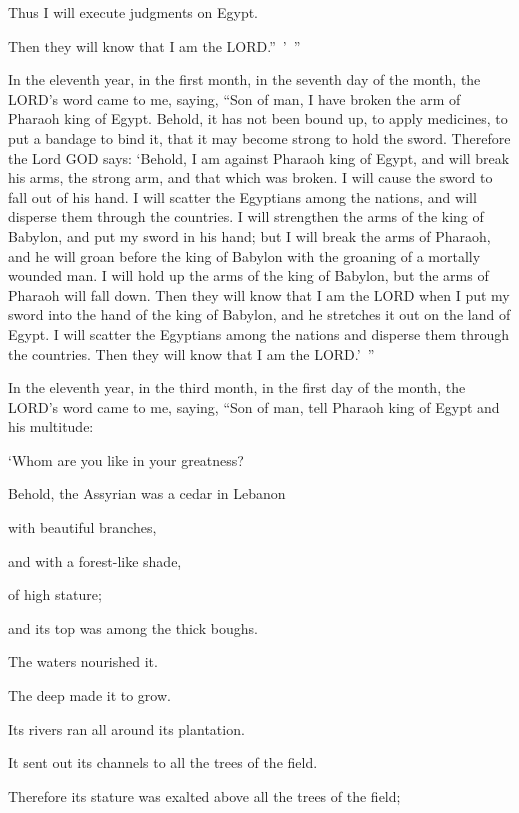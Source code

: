\myverse{}Thus I will execute judgments on Egypt.

Then they will know that I am the LORD.” ’ ”


\vspace{\baselineskip} \myverse{}In the eleventh year, in the first month, in the seventh day
of the month, the LORD’s word came to me, saying,
\myverse{}“Son of man, I have broken the arm of Pharaoh king of Egypt. Behold, it has
not been bound up, to apply medicines, to put a bandage to bind it, that it may become strong to hold
the sword.
\myverse{}Therefore the Lord GOD says: ‘Behold, I am against Pharaoh king of Egypt,
and will break his arms, the strong arm, and that which was broken. I will cause the sword to fall out
of his hand.
\myverse{}I will scatter the Egyptians among the nations, and will disperse them through
the countries.
\myverse{}I will strengthen the arms of the king of Babylon, and put my sword in his
hand; but I will break the arms of Pharaoh, and he will groan before the king of Babylon with the groaning
of a mortally wounded man.
\myverse{}I will hold up the arms of the king of Babylon, but the arms of Pharaoh will
fall down. Then they will know that I am the LORD when I put my sword into the hand of the king of Babylon,
and he stretches it out on the land of Egypt.
\myverse{}I will scatter the Egyptians among the nations and disperse them through
the countries. Then they will know that I am the LORD.’ ”


\mychapter{} \myverse*{}In the eleventh year, in the third month, in the first day of
the month, the LORD’s word came to me, saying,
\myverse{}“Son of man, tell Pharaoh king of Egypt and his multitude:

‘Whom are you like in your greatness?

\myverse{}Behold, the Assyrian was a cedar in Lebanon

with beautiful branches,

and with a forest-like shade,

of high stature;

and its top was among the thick boughs.

\myverse{}The waters nourished it.

The deep made it to grow.

Its rivers ran all around its plantation.

It sent out its channels to all the trees of the field.

\myverse{}Therefore its stature was exalted above all the trees of the
field;

